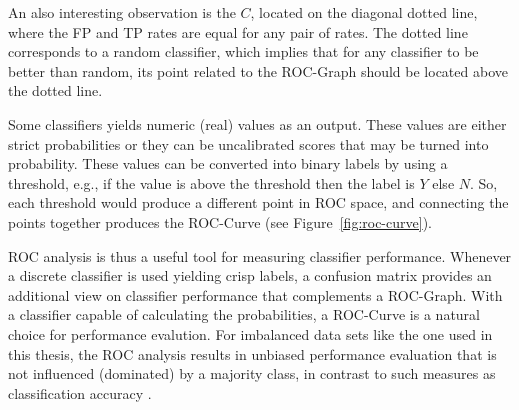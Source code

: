 An also interesting observation is the \(C\), located on the diagonal dotted line, where the FP and TP rates are equal for any pair of rates. The dotted line corresponds to a random classifier, which implies that for any classifier to be better than random, its point related to the ROC-Graph should be located above the dotted line.

Some classifiers yields numeric (real) values as an output. These values are either strict probabilities or they can be uncalibrated scores that may be turned into probability. These values can be converted into binary labels by using a threshold, e.g., if the value is above the threshold then the label is \(Y\) else \(N\). So, each threshold would produce a different point in ROC space, and connecting the points together produces the ROC-Curve (see Figure~\ref{fig:roc-curve}). 

ROC analysis is thus a useful tool for measuring classifier performance. Whenever a discrete classifier is used yielding crisp labels, a confusion matrix provides an additional view on classifier performance that complements a ROC-Graph. With a classifier capable of calculating the probabilities, a ROC-Curve is a natural choice for performance evalution. For imbalanced data sets like the one used in this thesis, the ROC analysis results in unbiased performance evaluation that is not influenced (dominated) by a majority class, in contrast to such measures as classification accuracy  \cite{Fawcett:2006:IRA:1159473.1159475}.

 






